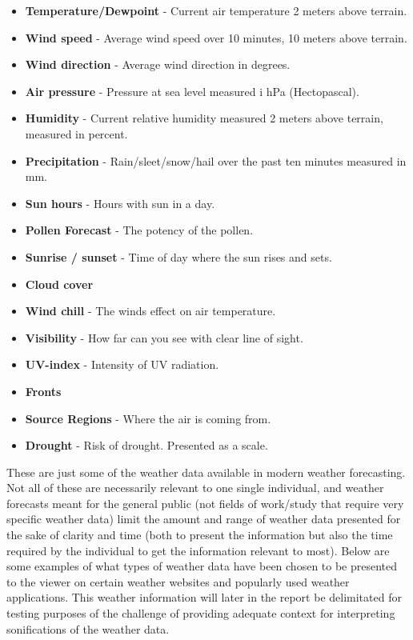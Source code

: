 \begin{itemize}
     \item \textbf{Temperature/Dewpoint} - Current air temperature 2 meters above terrain.
     \item \textbf{Wind speed} - Average wind speed over 10 minutes, 10 meters above terrain.
     \item \textbf{Wind direction} - Average wind direction in degrees.
     \item \textbf{Air pressure} - Pressure at sea level measured i hPa (Hectopascal).
     \item \textbf{Humidity} - Current relative humidity measured 2 meters above terrain, measured in percent.
     \item \textbf{Precipitation} - Rain/sleet/snow/hail over the past ten minutes measured in mm.
     \item \textbf{Sun hours} - Hours with sun in a day.
     \item \textbf{Pollen Forecast} - The potency of the pollen. 
     \item \textbf{Sunrise / sunset} - Time of day where the sun rises and sets.
     \item \textbf{Cloud cover}
     \item \textbf{Wind chill} - The winds effect on air temperature.
     \item \textbf{Visibility} - How far can you see with clear line of sight.
     \item \textbf{UV-index} - Intensity of UV radiation.
     \item \textbf{Fronts} 
     \item \textbf{Source Regions} - Where the air is coming from.
     \item \textbf{Drought} - Risk of drought. Presented as a scale.
 \end{itemize}

These are just some of the weather data available in modern weather forecasting. 
Not all of these are necessarily relevant to one single individual, and weather forecasts meant for the general public (not fields of work/study that require very specific weather data) limit the amount and range of weather data presented for the sake of clarity and time (both to present the information but also the time required by the individual to get the information relevant to most). 
Below are some examples of what types of weather data have been chosen to be presented to the viewer on certain weather websites and popularly used weather applications. 
This weather information will later in the report be delimitated for testing purposes of the challenge of providing adequate context for interpreting sonifications of the weather data.


